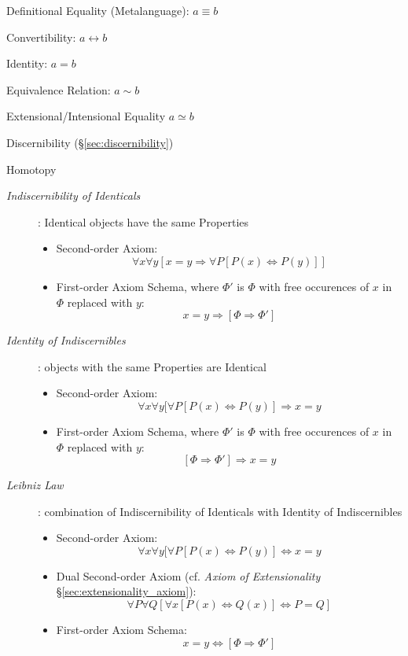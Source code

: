 Definitional Equality (Metalanguage): $a \equiv b$

Convertibility: $a \leftrightarrow b$

Identity: $a = b$

Equivalence Relation: $a \sim b$

Extensional/Intensional Equality $a \simeq b$

Discernibility (\S\ref{sec:discernibility})

Homotopy



\begin{description}

\item[\emph{Indiscernibility of Identicals}]: Identical objects have
the same Properties
\begin{itemize}
    \item Second-order Axiom:
    \[
        \forall x \forall y
        [ x = y \Rightarrow \forall P [ P(x) \Leftrightarrow P(y) ]]
    \]
    \item First-order Axiom Schema, where $\Phi'$ is $\Phi$ with free
      occurences of $x$ in $\Phi$ replaced with $y$:
    \[
        x = y \Rightarrow [\Phi \Rightarrow \Phi']
    \]
\end{itemize}

\item[\emph{Identity of Indiscernibles}]: objects with the same Properties
are Identical
\begin{itemize}
    \item Second-order Axiom:
    \[
        \forall x \forall y
        [ \forall P [ P(x) \Leftrightarrow P(y) ] \Rightarrow x = y
    \]
    \item First-order Axiom Schema, where $\Phi'$ is $\Phi$ with free
      occurences of $x$ in $\Phi$ replaced with $y$:
    \[
        [\Phi \Rightarrow \Phi'] \Rightarrow x = y
    \]
\end{itemize}

\item[\emph{Leibniz Law}]: combination of Indiscernibility of
  Identicals with Identity of Indiscernibles
\begin{itemize}
    \item Second-order Axiom:
    \[
        \forall x \forall y
        [ \forall P [ P(x) \Leftrightarrow P(y) ] \Leftrightarrow x = y
    \]
    \item Dual Second-order Axiom (cf. \emph{Axiom of Extensionality}
      \S\ref{sec:extensionality_axiom}):
    \[
        \forall P \forall Q
        [ \forall x [P(x) \Leftrightarrow Q(x)] \Leftrightarrow P = Q ]
    \]
    \item First-order Axiom Schema:
    \[
        x = y \Leftrightarrow [\Phi \Rightarrow \Phi']
    \]
\end{itemize}


\end{description}



